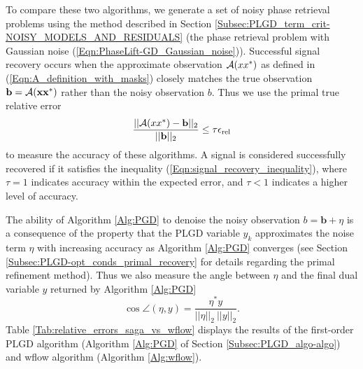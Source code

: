To compare these two algorithms, we generate a set of noisy phase retrieval problems using the method described in Section \ref{Subsec:PLGD_term_crit-NOISY_MODELS_AND_RESIDUALS} (the phase retrieval problem with Gaussian noise (\ref{Eqn:PhaseLift-GD_Gaussian_noise})).
Successful signal recovery occurs when the approximate observation ${\mathcal A}(xx^*)$ as defined in (\ref{Eqn:A_definition_with_masks}) closely matches the true observation $\mathbf{b} = {\mathcal A}(\mathbf{x}\mathbf{x}^*)$ rather than the noisy observation $b$.  
Thus we use the primal true relative error 
\begin{equation} 	\label{Eqn:signal_recovery_inequality}
\frac{||{\mathcal A}(xx^*)-\mathbf{b}||_2}{ ||\mathbf{b}||_2 } \leq \tau \epsilon_{\textnormal{rel}}
\end{equation}
to measure the accuracy of these algorithms.  
A signal is considered successfully recovered if it satisfies the inequality (\ref{Eqn:signal_recovery_inequality}), where $\tau = 1$ indicates accuracy within the expected error, and $\tau < 1$ indicates a higher level of accuracy.  



The ability of Algorithm \ref{Alg:PGD} to denoise the noisy observation $b = \mathbf{b} + \eta$ is a consequence of the property that the PLGD variable $y_k$ approximates the noise term $\eta$ with increasing accuracy as Algorithm \ref{Alg:PGD} converges (see Section \ref{Subsec:PLGD-opt_conds_primal_recovery} for details regarding the primal refinement method).
Thus we also measure the angle between $\eta$ and the final dual variable $y$ returned by Algorithm \ref{Alg:PGD}
\begin{equation} 			\label{Eqn:angle_eta_y}
	\cos \angle (\eta, y)	=	\frac{\eta^*y}{||\eta||_2 \ ||y||_2}.
\end{equation}
Table \ref{Tab:relative_errors_saga_vs_wflow} displays the results of the first-order PLGD algorithm (Algorithm \ref{Alg:PGD} of Section \ref{Subsec:PLGD_algo-algo}) and wflow algorithm (Algorithm \ref{Alg:wflow}).


